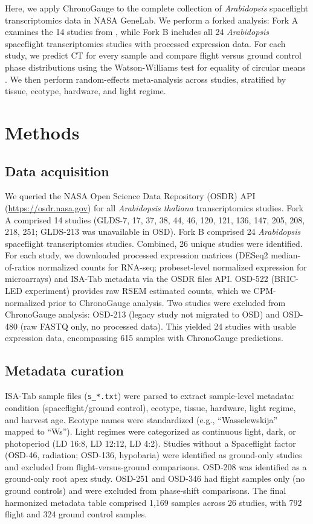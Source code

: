 \documentclass[11pt,a4paper]{article}
\begin{document}
Here, we apply ChronoGauge to the complete collection of \textit{Arabidopsis} spaceflight transcriptomics data in NASA GeneLab. We perform a forked analysis: Fork A examines the 14 studies from \citet{Barker2023}, while Fork B includes all 24 \textit{Arabidopsis} spaceflight transcriptomics studies with processed expression data. For each study, we predict CT for every sample and compare flight versus ground control phase distributions using the Watson-Williams test for equality of circular means \citep{Watson1956}. We then perform random-effects meta-analysis across studies, stratified by tissue, ecotype, hardware, and light regime.

\section*{Methods}

\subsection*{Data acquisition}

We queried the NASA Open Science Data Repository (OSDR) API (\url{https://osdr.nasa.gov}) for all \textit{Arabidopsis thaliana} transcriptomics studies. Fork A comprised 14 studies (GLDS-7, 17, 37, 38, 44, 46, 120, 121, 136, 147, 205, 208, 218, 251; GLDS-213 was unavailable in OSD). Fork B comprised 24 \textit{Arabidopsis} spaceflight transcriptomics studies. Combined, 26 unique studies were identified. For each study, we downloaded processed expression matrices (DESeq2 median-of-ratios normalized counts for RNA-seq; probeset-level normalized expression for microarrays) and ISA-Tab metadata via the OSDR files API. OSD-522 (BRIC-LED experiment) provides raw RSEM estimated counts, which we CPM-normalized prior to ChronoGauge analysis. Two studies were excluded from ChronoGauge analysis: OSD-213 (legacy study not migrated to OSD) and OSD-480 (raw FASTQ only, no processed data). This yielded 24 studies with usable expression data, encompassing 615 samples with ChronoGauge predictions.

\subsection*{Metadata curation}

ISA-Tab sample files (\texttt{s\_*.txt}) were parsed to extract sample-level metadata: condition (spaceflight/ground control), ecotype, tissue, hardware, light regime, and harvest age. Ecotype names were standardized (e.g., ``Wasselewskija'' mapped to ``Ws''). Light regimes were categorized as continuous light, dark, or photoperiod (LD 16:8, LD 12:12, LD 4:2). Studies without a Spaceflight factor (OSD-46, radiation; OSD-136, hypobaria) were identified as ground-only studies and excluded from flight-versus-ground comparisons. OSD-208 was identified as a ground-only root apex study. OSD-251 and OSD-346 had flight samples only (no ground controls) and were excluded from phase-shift comparisons. The final harmonized metadata table comprised 1,169 samples across 26 studies, with 792 flight and 324 ground control samples.
\end{document}
